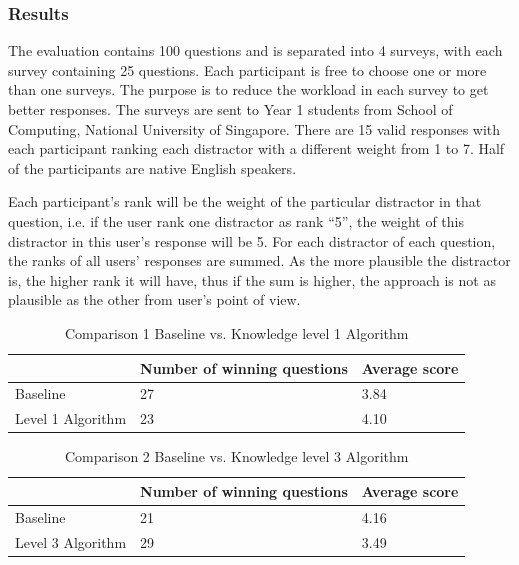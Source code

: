 \subsubsection{Results}
The evaluation contains 100 questions and is separated into 4 surveys, with each survey containing 25 questions. Each participant is free to choose one or more than one surveys. The purpose is to reduce the workload in each survey to get better responses. The surveys are sent to Year 1 students from School of Computing, National University of Singapore.  There are 15 valid responses with each participant ranking each distractor with a different weight from 1 to 7. Half of the participants are native English speakers.


Each participant’s rank will be the weight of the particular distractor in that question, i.e. if the user rank one distractor as rank “5”, the weight of this distractor in this user’s response will be 5. For each distractor of each question, the ranks of all users’ responses are summed. As the more plausible the distractor is, the higher rank it will have, thus if the sum is higher, the approach is not as plausible as the other from user’s point of view.

\begin{table}[ht]
    \caption{Comparison 1 Baseline vs. Knowledge level 1 Algorithm}
    \label{table:distractor_1}
    \begin{center}
    \begin{tabular}{| p{1.5cm} | p{2.5cm} | p{2.2cm} |}
        \hline
         & Number of winning questions & Average score\\
        \hline
        Baseline & 27 & 3.84\\
        \hline
        Level 1 Algorithm & 23 & 4.10\\
        \hline
    \end{tabular}
    \end{center}
\end{table}

\begin{table}[ht]
    \caption{Comparison 2 Baseline vs. Knowledge level 3 Algorithm}
    \label{table:distractor_2}
    \begin{center}
    \begin{tabular}{| p{1.5cm} | p{2.5cm} | p{2.2cm} |}
        \hline
         & Number of winning questions & Average score\\
        \hline
        Baseline & 21 & 4.16\\
        \hline
        Level 3 Algorithm & 29 & 3.49\\
        \hline
    \end{tabular}
    \end{center}
\end{table}

